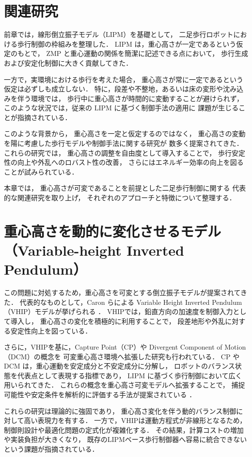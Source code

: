 \section{関連研究}
\label{sec:related_work}

前章では，線形倒立振子モデル（LIPM）を基礎として，
二足歩行ロボットにおける歩行制御の枠組みを整理した．
LIPM は，重心高さが一定であるという仮定のもとで，
ZMP と重心運動の関係を簡潔に記述できる点において，
歩行生成および安定化制御に大きく貢献してきた．

一方で，実環境における歩行を考えた場合，
重心高さが常に一定であるという仮定は必ずしも成立しない．
特に，段差や不整地，あるいは床の変形や沈み込みを伴う環境では，
歩行中に重心高さが時間的に変動することが避けられず，
このような状況では，従来の LIPM に基づく制御手法の適用に
課題が生じることが指摘されている．

このような背景から，
重心高さを一定と仮定するのではなく，
重心高さの変動を陽に考慮した歩行モデルや制御手法に関する研究が
数多く提案されてきた．
これらの研究では，
重心高さの調整を自由度として導入することで，
歩行安定性の向上や外乱へのロバスト性の改善，
さらにはエネルギー効率の向上を図ることが試みられている．

本章では，
重心高さが可変であることを前提とした二足歩行制御に関する
代表的な関連研究を取り上げ，
それぞれのアプローチと特徴について整理する．


\section{重心高さを動的に変化させるモデル（Variable-height Inverted Pendulum）}

この問題に対処するため，重心高さを可変とする倒立振子モデルが提案されてきた．
代表的なものとして，Caron らによる
Variable Height Inverted Pendulum（VHIP）モデルが挙げられる
\cite{caron2017,caron2019}．
VHIPでは，鉛直方向の加速度を制御入力として導入し，
重心高さの変化を積極的に利用することで，
段差地形や外乱に対する安定性向上を図っている．

さらに，VHIPを基に，Capture Point（CP）や
Divergent Component of Motion（DCM）の概念を
可変重心高さ環境へ拡張した研究も行われている．
CP や DCM は，重心運動を安定成分と不安定成分に分解し，
ロボットのバランス状態を代表点として表現する指標であり，
LIPM に基づく歩行制御において広く用いられてきた．
これらの概念を重心高さ可変モデルへ拡張することで，
捕捉可能性や安定条件を解析的に評価する手法が提案されている
\cite{liu2020}．

これらの研究は理論的に強固であり，
重心高さ変化を伴う動的バランス制御に対して高い表現力を有する．
一方で，VHIPは運動方程式が非線形となるため，
制御則設計や最適化問題の定式化が複雑化する．
その結果，計算コストの増加や実装負担が大きくなり，
既存のLIPMベース歩行制御器へ容易に統合できないという課題が指摘されている．

